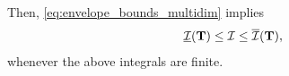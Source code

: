 \documentclass[review]{elsarticle}
\newtheorem{theorem}{\em Theorem}
\def\T{{\bf T}}
\begin{document}
{\begin{equation}
\end{equation}
Then, \eqref{eq:envelope_bounds_multidim} implies
\begin{equation}
\label{eq:bracketing_multidim}
\underline{\mathcal{I}}(\T)\le \mathcal{I} \le \overline{\mathcal{I}}(\T),
\end{equation}
whenever the above integrals are finite.
%
}
\end{document}
